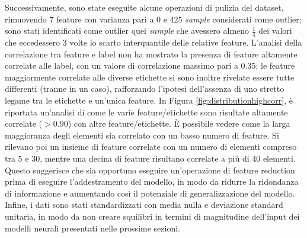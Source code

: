 Successivamente, sono state eseguite alcune operazioni di pulizia del dataset, rimuovendo $7$ feature con varianza pari a $0$ e $425$ \textit{sample} considerati come outlier; sono stati identificati come outlier quei \textit{sample} che avessero almeno $\frac{1}{4}$ dei valori che eccedessero $3$ volte lo scarto interquantile delle relative feature.
L'analisi della correlazione tra feature e label non ha mostrato la presenza di feature altamente correlate alle label, con un valore di correlazione massimo pari a $0.35$; le feature maggiormente correlate alle diverse etichette si sono inoltre rivelate essere tutte differenti (tranne in un caso), rafforzando l'ipotesi dell'assenza di uno stretto legame tra le etichette e un'unica feature.
In Figura \ref{fig:distributionhighcorr}, è riportata un'analisi di come le varie feature/etichette sono risultate altamente correlate ($> 0.90$) con altre feature/etichette. 
È possibile vedere come la larga maggioranza degli elementi sia correlato con un basso numero di feature.
Si rilevano poi un insieme di feature correlate con un numero di elementi compreso tra $5$ e $30$, mentre una decina di feature risultano correlate a più di 40 elementi. 
Questo suggerisce che sia opportuno eseguire un'operazione di feature reduction prima di eseguire l'addestramento del modello, in modo da ridurre la ridondanza di informazione e aumentando così il potenziale di generalizzazione del modello.
Infine, i dati sono stati standardizzati con media nulla e deviazione standard unitaria, in modo da non creare squilibri in termini di magnitudine dell'input dei modelli neurali presentati nelle prossime sezioni.%